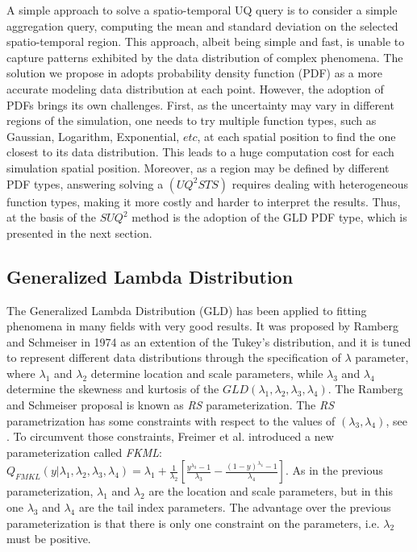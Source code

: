 \documentclass[11pt]{article}
\begin{document}
A simple approach to solve a spatio-temporal UQ query is to consider a simple aggregation query, computing the mean and standard deviation on the selected spatio-temporal region. This approach, albeit being simple and fast, is unable to capture  patterns exhibited by the data distribution of complex phenomena. The solution we propose in \cite{Liu2019} adopts probability density function (PDF) as a more accurate modeling data distribution at each point. However, the adoption of PDFs brings its own challenges. First, as the uncertainty may vary in different regions of the simulation, one needs to try multiple function types, such as Gaussian, Logarithm, Exponential, $etc$, at each spatial position to find the one closest to its data distribution. This leads to a huge computation cost for each simulation spatial position. Moreover, as a region may be defined by different PDF types, answering solving a
$(UQ^2STS)$ requires dealing with heterogeneous function types, making it more costly and harder to interpret the results. Thus, at the basis of the $SUQ^2$ method is the adoption of the GLD PDF type, which is presented in the next section. 

\subsection{Generalized Lambda Distribution}
\label{materials_methods}

The Generalized Lambda Distribution (GLD) has been applied to fitting phenomena in many fields with very good results. It was proposed by Ramberg and Schmeiser in 1974 \cite{Ramberg1974} as an extention of the Tukey's distribution, and it is tuned to represent different data distributions through the specification of $\lambda$ parameter, where $\lambda_{1}$ and $\lambda_{2}$ determine location and scale parameters, while $\lambda_{3}$  and $\lambda_{4}$ determine the skewness and kurtosis of the $GLD(\lambda_{1},\lambda_{2},\lambda_{3},\lambda_{4})$. The Ramberg and Schmeiser proposal is known as \textit{RS} parameterization.
The \textit{RS} parametrization has some constraints with respect to the values of  $(\lambda_{3}, \lambda_{4})$, see \cite{Karian2011}. To circumvent those constraints, Freimer et al. \cite{Freimer1988} introduced a new parameterization called \textit{FKML}: $Q_{FMKL}(y|\lambda_{1}, \lambda_{2}, \lambda_{3}, \lambda_{4})=\lambda_{1}+\frac{1}{\lambda_{2}}\left[\frac{y^{\lambda_{3}}-1}{\lambda_{3}} - \frac{(1-y)^{\lambda_{4}}-1}{\lambda_{4}} \right] $. As in the previous parameterization, $\lambda_{1}$ and $\lambda_{2}$ are the location and scale parameters, but in this one $\lambda_{3}$ and $\lambda_{4}$ are the tail index parameters. The advantage over the previous parameterization is that there is only one constraint on the parameters, i.e. $\lambda_{2}$ must be positive. 
\end{document}
